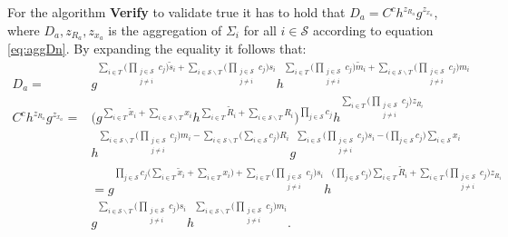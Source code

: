 For the algorithm \textbf{Verify} to validate true it has to hold that $D_a=C^ch^{z_{R_a}}g^{z_{x_a}}$, where $D_a,z_{R_a},z_{x_a}$ is the aggregation of $\Sigma_i$ for all $i\in\mathcal{S}$  according to equation \eqref{eq:aggDn}. By expanding the equality it follows that:
\begin{align*}
D_a =& g ^ {\sum_{i\in T } \Big(\prod_{\substack{j\in\mathcal{S}\\ j\neq i}}   c_j \Big)\tilde{s}_i + \sum_{i\in\mathcal{S}\backslash T } \Big(\prod_{\substack{j\in\mathcal{S}\\ j\neq i}}   c_j \Big)s_i} h^ {\sum_{i\in T } \Big(\prod_{\substack{j\in\mathcal{S}\\ j\neq i}}    c_j \Big)\tilde{m}_i+ \sum_{i\in\mathcal{S}\backslash T} \Big(\prod_{\substack{j\in\mathcal{S}\\ j\neq i}}    c_j \Big)m_i } 
 \\
 C^ch^{z_{R_a}}g^{z_{x_a}} =&   \Big( g^{\sum_{i\in T} \tilde{x}_i + \sum_{i\in \mathcal{S}\backslash T} x_i} h^{\sum_{i\in T} \tilde{R}_i + \sum_{i\in \mathcal{S}\backslash T} R_i}  \Big) ^{\prod_{j\in\mathcal{S}} c_j}  h^{ \sum_{i\in T } \Big( \prod_{\substack{j\in\mathcal{S}\\ j\neq i}} c_j \Big) z_{R_i}}
 \\
& h^{\sum_{i\in\mathcal{S}\backslash T } \Big( \prod_{\substack{j\in\mathcal{S}\\ j\neq i}}   c_j \Big) m_i - \sum_{i\in\mathcal{S} \backslash T} \big( \sum_{i\in\mathcal{S}} c_j\big)R_i}  
g^{ \sum_{i\in\mathcal{S}} \Big( \prod_{\substack{j\in\mathcal{S}\\ j\neq i}}   c_j \Big)s_i - \big( \prod_{j\in\mathcal{S}} c_j \Big) \sum_{i\in\mathcal{S}} x_i}
\\ 
 &=  g ^{\prod_{j\in\mathcal{S}} c_j \big(\sum_{i\in T} \tilde{x}_i + \sum_{i\in T} x_i\big) +  \sum_{i\in T} \big( \prod_{\substack{j\in\mathcal{S}\\ j\neq i}} c_j\big) s_i     } h^{ \big(\prod_{j\in\mathcal{S}} c_j\big)\sum_{i\in T} \tilde{R}_i  + \sum_{i\in T } \Big( \prod_{\substack{j\in\mathcal{S}\\ j\neq i}} c_j \Big) z_{R_i} }
\\
& 
g ^ {\sum_{i\in\mathcal{S}\backslash T } \Big(\prod_{\substack{j\in\mathcal{S}\\ j\neq i}}   c_j \Big)s_i} h^ { \sum_{i\in\mathcal{S}\backslash T} \Big(\prod_{\substack{j\in\mathcal{S}\\ j\neq i}}    c_j  \Big) m_i} .
\end{align*}

